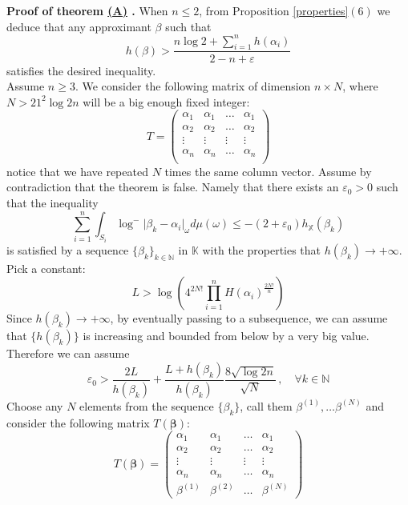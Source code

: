 \documentclass[10 pt,a4paper]{article}
\theoremstyle{plain}
\theoremstyle{definition}
\theoremstyle{named}
\newcommand\bref[3][blue]{%
    \begingroup%
    \hypersetup{linkcolor=#1}%
    \hyperlink{#2}{#3}%
    \endgroup}
\begin{document}

\textbf{Proof of theorem \bref{thm:main}{(A)}.}
When  $n \le 2$, from  Proposition \ref{properties}$(6)$ we deduce that  any approximant $\beta$ such that 
$$
h(\beta)>\frac{n\log 2+\sum^n_{i=1}h(\alpha_i)}{2-n+\varepsilon}
$$
satisfies the desired inequality.\\
 

 Assume $n\ge 3$. We consider the following matrix of dimension $n\times N$, where $N>21^2\log 2n$ will be a big enough fixed integer:
\[
T=\begin{pmatrix}
 \alpha_1& \alpha_1  &\ldots &\alpha_1 \\
 \alpha_2& \alpha_2  &\ldots &\alpha_2\\
\vdots & \vdots  & \vdots & \vdots\\
\alpha_n& \alpha_n  &\ldots &\alpha_n\\
\end{pmatrix}
\]
notice that we have repeated $N$ times the same column vector. Assume by contradiction that the theorem is false. Namely that there exists an $\varepsilon_0>0$ such that the inequality
\begin{equation}\label{negationroth}
\sum^n_{i=1}\int_{S_i}\log^-\vert \beta_k-\alpha_i\vert_\omega d\mu(\omega)\le-(2+\varepsilon_0)h_\mathbb X(\beta_k)
\end{equation}
is satisfied by  a sequence $\{\beta_k\}_{k\in\mathbb N}$ in $\mathbb K$ with the properties that $h(\beta_k)\to+\infty$. Pick a constant:
\[
L>  \log\left(4^{2N!}\prod^n_{i=1}H(\alpha_i)^{\frac{2N!}{n}}\right) 
\]
Since $h(\beta_k)\to+\infty$, by eventually passing to a subsequence,  we can assume that  $\{h(\beta_k)\}$ is increasing and bounded from below by a very  big value. Therefore we can assume
\begin{equation}\label{magg-eps}
\varepsilon_0>\frac{2L}{h(\beta_k)}+\frac{L+h(\beta_k)}{h(\beta_k)}\frac{8\sqrt{\log 2n}}{\sqrt N}\,,\quad \forall  k\in\mathbb N
\end{equation}
Choose  any $N$ elements from the sequence $\{\beta_{k}\}$, call them $\beta^{(1)},\ldots\beta^{(N)}$ and consider the following matrix $T(\bm\beta)$:
\[
T(\bm\beta)=\begin{pmatrix}
 \alpha_1& \alpha_1  &\ldots &\alpha_1 \\
 \alpha_2& \alpha_2  &\ldots &\alpha_2\\
\vdots & \vdots & \vdots & \vdots\\
\alpha_n& \alpha_n  &\ldots &\alpha_n\\
\beta^{(1)}& \beta^{(2)}  &\ldots &\beta^{(N)}
\end{pmatrix}
\]
\end{document}
